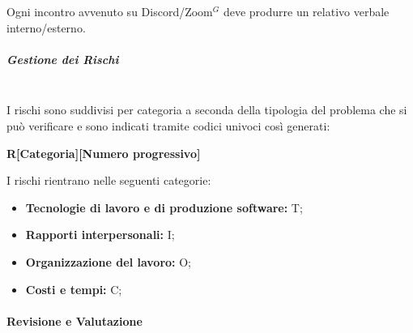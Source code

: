 Ogni incontro avvenuto su Discord/Zoom$^{G}$ deve produrre un relativo verbale interno/esterno.

\subparagraph{Gestione dei Rischi}
\mbox{}\\
I rischi sono suddivisi per categoria a seconda della tipologia del problema che si può verificare e
sono indicati tramite codici univoci così generati:

\begin{center}
    \textbf{R[Categoria][Numero progressivo]}
\end{center}

I rischi rientrano nelle seguenti categorie:
\begin{itemize}
    \item \textbf{Tecnologie di lavoro e di produzione software:} T;
    \item \textbf{Rapporti interpersonali:} I;
    \item \textbf{Organizzazione del lavoro:} O;
    \item \textbf{Costi e tempi:} C;
\end{itemize}


\paragraph{Revisione e Valutazione}

